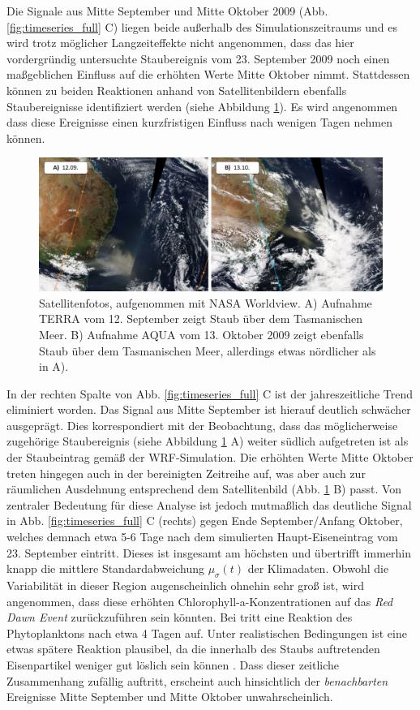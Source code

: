 \documentclass[12pt,a4paper,onecolumn]{scrartcl}
\begin{document}
Die Signale aus Mitte September und Mitte Oktober 2009 (Abb. \ref{fig:timeseries_full} C) liegen beide außerhalb des Simulationszeitraums und es wird trotz möglicher Langzeiteffekte \citep{Boyd.2010} nicht angenommen, dass das hier vordergründig untersuchte Staubereignis vom 23. September 2009 noch einen maßgeblichen Einfluss auf die erhöhten Werte Mitte Oktober nimmt. Stattdessen können zu beiden Reaktionen anhand von Satellitenbildern ebenfalls Staubereignisse identifiziert werden (siehe Abbildung \ref{fig:duststorms_surrounding}). Es wird angenommen dass diese Ereignisse einen kurzfristigen Einfluss nach wenigen Tagen nehmen können. 
\begin{figure}[!htb]
\includegraphics[width=\textwidth]{bilder/duststorms_surround.png}
\caption{Satellitenfotos, aufgenommen mit NASA Worldview. A) Aufnahme TERRA vom 12. September zeigt Staub über dem Tasmanischen Meer. B) Aufnahme AQUA vom 13. Oktober 2009 zeigt ebenfalls Staub über dem Tasmanischen Meer, allerdings etwas nördlicher als in A). } \label{fig:duststorms_surrounding}
\end{figure}
In der rechten Spalte von Abb. \ref{fig:timeseries_full} C ist der jahreszeitliche Trend eliminiert worden. Das Signal aus Mitte September ist hierauf deutlich schwächer ausgeprägt. Dies korrespondiert mit der Beobachtung, dass das möglicherweise zugehörige Staubereignis (siehe Abbildung \ref{fig:duststorms_surrounding} A) weiter südlich aufgetreten ist als der Staubeintrag gemäß der WRF-Simulation. Die erhöhten Werte Mitte Oktober treten hingegen auch in der bereinigten Zeitreihe auf, was aber auch zur räumlichen Ausdehnung entsprechend dem Satellitenbild (Abb. \ref{fig:duststorms_surrounding} B) passt. Von zentraler Bedeutung für diese Analyse ist jedoch mutmaßlich das deutliche Signal in Abb. \ref{fig:timeseries_full} C (rechts) gegen Ende September/Anfang Oktober, welches demnach etwa 5-6 Tage nach dem simulierten Haupt-Eiseneintrag vom 23. September eintritt. Dieses ist insgesamt am höchsten und übertrifft immerhin knapp die mittlere Standardabweichung $\mu_\sigma(t)$ der Klimadaten. Obwohl die Variabilität in dieser Region augenscheinlich ohnehin sehr groß ist, wird angenommen, dass diese erhöhten Chlorophyll-a-Konzentrationen auf das \textit{Red Dawn Event} zurückzuführen sein könnten. Bei \citet{Martin.1988} tritt eine Reaktion des Phytoplanktons nach etwa 4 Tagen auf. Unter realistischen Bedingungen ist eine etwas spätere Reaktion plausibel, da die innerhalb des Staubs auftretenden Eisenpartikel weniger gut löslich sein können \citep{Shao.2011}. Dass dieser zeitliche Zusammenhang zufällig auftritt, erscheint auch hinsichtlich der \textit{benachbarten} Ereignisse Mitte September und Mitte Oktober unwahrscheinlich. \\
\end{document}
